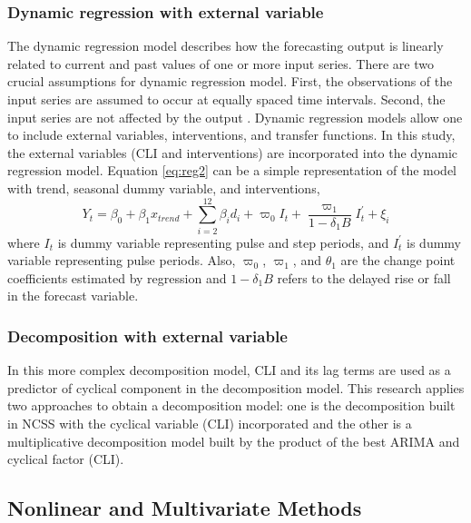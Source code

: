 \subsubsection{Dynamic regression with external variable}
The dynamic regression model describes how the forecasting output is linearly related to current and past values of one or more input series. There are two crucial assumptions for dynamic regression model. First, the observations of the input series are assumed to occur at equally spaced time intervals. Second, the input series are not affected by the output \citep{pankratz2012}. Dynamic regression models allow one to include external variables, interventions, and transfer functions. In this study, the external variables (CLI and interventions) are incorporated into the dynamic regression model. Equation \ref{eq:reg2} can be a simple representation of the model with trend, seasonal dummy variable, and interventions,
\begin{equation}
Y_t = \beta_0+\beta_1 x_{trend} + \sum_{i=2}^{12} {\beta_i d_i}+\varpi_0 I_t +\frac{\varpi_1}{1-\delta_1 B} I^{'}_t +\xi_i
\label{eq:reg2}
\end{equation}
where $I_t$ is dummy variable representing pulse and step periods, and $I^{'}_t$ is dummy variable representing pulse periods. Also, $\varpi_0$, $\varpi_1$, and $\theta_1$ are the change point coefficients estimated by regression and $1-\delta_1 B$ refers to the delayed rise or fall in the forecast variable.
  
\subsubsection{Decomposition with external variable}
In this more complex decomposition model, CLI and its lag terms are used as a predictor of cyclical component in the decomposition model. This research applies two approaches to obtain a decomposition model: one is the decomposition built in NCSS with the cyclical variable (CLI) incorporated and the other is a multiplicative decomposition model built by the product of the best ARIMA and cyclical factor (CLI). 
\subsection{Nonlinear and Multivariate Methods}
